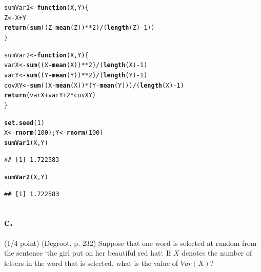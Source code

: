 \documentclass{article}\usepackage[]{graphicx}\usepackage[]{color}
\makeatletter
\newcommand{\hlnum}[1]{\textcolor[rgb]{0.686,0.059,0.569}{#1}}%
\newcommand{\hlopt}[1]{\textcolor[rgb]{0,0,0}{#1}}%
\newcommand{\hlstd}[1]{\textcolor[rgb]{0.345,0.345,0.345}{#1}}%
\newcommand{\hlkwa}[1]{\textcolor[rgb]{0.161,0.373,0.58}{\textbf{#1}}}%
\newcommand{\hlkwb}[1]{\textcolor[rgb]{0.69,0.353,0.396}{#1}}%
\newcommand{\hlkwc}[1]{\textcolor[rgb]{0.333,0.667,0.333}{#1}}%
\newcommand{\hlkwd}[1]{\textcolor[rgb]{0.737,0.353,0.396}{\textbf{#1}}}%
\newenvironment{kframe}{%
 \def\at@end@of@kframe{}%
 \ifinner\ifhmode%
  \def\at@end@of@kframe{\end{minipage}}%
  \begin{minipage}{\columnwidth}%
 \fi\fi%
 \def\FrameCommand##1{\hskip\@totalleftmargin \hskip-\fboxsep
 \colorbox{shadecolor}{##1}\hskip-\fboxsep
     \hskip-\linewidth \hskip-\@totalleftmargin \hskip\columnwidth}%
 \MakeFramed {\advance\hsize-\width
   \@totalleftmargin\z@ \linewidth\hsize
   \@setminipage}}%
 {\par\unskip\endMakeFramed%
 \at@end@of@kframe}
\newenvironment{knitrout}{}{} %
\makeatother
\begin{document}
\begin{knitrout}
\color{fgcolor}\begin{kframe}
\begin{alltt}
\hlstd{sumVar1} \hlkwb{<-} \hlkwa{function}\hlstd{(}\hlkwc{X}\hlstd{,} \hlkwc{Y}\hlstd{) \{}
  \hlstd{Z} \hlkwb{<-} \hlstd{X} \hlopt{+} \hlstd{Y}
  \hlkwd{return}\hlstd{(}\hlkwd{sum}\hlstd{((Z} \hlopt{-} \hlkwd{mean}\hlstd{(Z))}\hlopt{**}\hlnum{2}\hlstd{)} \hlopt{/} \hlstd{(}\hlkwd{length}\hlstd{(Z)} \hlopt{-} \hlnum{1}\hlstd{))}
\hlstd{\}}

\hlstd{sumVar2} \hlkwb{<-} \hlkwa{function}\hlstd{(}\hlkwc{X}\hlstd{,} \hlkwc{Y}\hlstd{) \{}
  \hlstd{varX} \hlkwb{<-} \hlkwd{sum}\hlstd{((X} \hlopt{-} \hlkwd{mean}\hlstd{(X))}\hlopt{**}\hlnum{2}\hlstd{)} \hlopt{/} \hlstd{(}\hlkwd{length}\hlstd{(X)} \hlopt{-} \hlnum{1}\hlstd{)}
  \hlstd{varY} \hlkwb{<-} \hlkwd{sum}\hlstd{((Y} \hlopt{-} \hlkwd{mean}\hlstd{(Y))}\hlopt{**}\hlnum{2}\hlstd{)} \hlopt{/} \hlstd{(}\hlkwd{length}\hlstd{(Y)} \hlopt{-} \hlnum{1}\hlstd{)}
  \hlstd{covXY} \hlkwb{<-} \hlkwd{sum}\hlstd{((X} \hlopt{-} \hlkwd{mean}\hlstd{(X))} \hlopt{*} \hlstd{(Y} \hlopt{-} \hlkwd{mean}\hlstd{(Y)))} \hlopt{/} \hlstd{(}\hlkwd{length}\hlstd{(X)} \hlopt{-} \hlnum{1}\hlstd{)}
  \hlkwd{return}\hlstd{(varX} \hlopt{+} \hlstd{varY} \hlopt{+} \hlnum{2} \hlopt{*} \hlstd{covXY)}
\hlstd{\}}

\hlkwd{set.seed}\hlstd{(}\hlnum{1}\hlstd{)}
\hlstd{X} \hlkwb{<-} \hlkwd{rnorm}\hlstd{(}\hlnum{100}\hlstd{) ; Y} \hlkwb{<-} \hlkwd{rnorm}\hlstd{(}\hlnum{100}\hlstd{)}
\hlkwd{sumVar1}\hlstd{(X, Y)}
\end{alltt}
\begin{verbatim}
## [1] 1.722583
\end{verbatim}
\begin{alltt}
\hlkwd{sumVar2}\hlstd{(X, Y)}
\end{alltt}
\begin{verbatim}
## [1] 1.722583
\end{verbatim}
\end{kframe}
\end{knitrout}


\subsection*{c.} (1/4 point) (Degroot, p. 232) Suppose that one word is selected at random from the sentence `the girl put on her beautiful red hat`. If $X$ denotes the number of letters in the word that is selected, what is the value of $Var(X)$?
\end{document}
